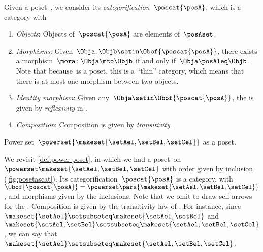 \begin{ctdefinition}\label{def:poscat}
    Given a poset~\posA, we consider its \emph{categorification}~$\poscat{\posA}$, which is a category with
    \begin{enumerate}
        \item \emph{Objects}: Objects of~$\poscat{\posA}$ are elements of~$\posAset$;
        \item \emph{Morphisms}: Given~$\Obja,\Objb\setin \Obof{\poscat{\posA}}$, there exists a morphism~$\mora\colon \Obja\mto \Objb$ if and only if~$\Obja \posAleq \Objb$.
              Note that because~\posA is a poset, this is a ``thin'' category, which means that there is at most one morphism between two objects.
        \item \emph{Identity morphism}: Given any~$\Obja \setin \Obof{\poscat{\posA}}$, the  is given by \emph{reflexivity} in .
        \item \emph{Composition}: Composition is given by \emph{transitivity}.
    \end{enumerate}
\end{ctdefinition}

\begin{marginfigure}
    \centering
    \caption{Power set~$\powerset{\makeset{\setAel,\setBel,\setCel}}$ as a poset. \label{fig:posetascat}}
\end{marginfigure}

\begin{example}
    We revisit \cref{def:power-poset}, in which we had a poset~\posA on $\powerset \makeset{\setAel,\setBel,\setCel}$ with order given by inclusion (\cref{fig:posetascat}).
    Its categorification~$\poscat{\posA}$ is a category, with $\Obof{\poscat{\posA}}=\powerset\pars{\makeset{\setAel,\setBel,\setCel}}$, and morphisms given by the inclusions.
    Note that we omit to draw self-arrows for the .
    Composition is given by the transitivity law of .
    For instance, since~$\makeset{\setAel}\setsubseteq \makeset{\setAel,\setBel}$ and~$\makeset{\setAel,\setBel} \setsubseteq \makeset{\setAel,\setBel,\setCel}$, we can say that~$\makeset{\setAel}\setsubseteq \makeset{\setAel,\setBel,\setCel}$.
\end{example}


